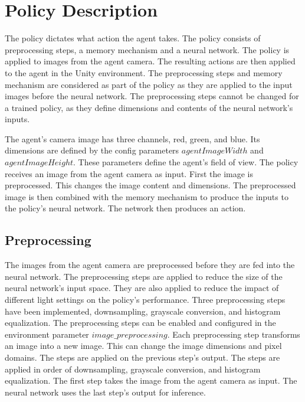 
\section{Policy Description}

\label{fig:policy_description}

The policy dictates what action the agent takes. The policy consists of preprocessing steps, a memory mechanism and a neural network. The policy is applied to images from the agent camera. The resulting actions are then applied to the agent in the Unity environment. 
The preprocessing steps and memory mechanism are considered as part of the policy as they are applied to the input images before the neural network. The preprocessing steps cannot be changed for a trained policy, as they define dimensions and contents of the neural network's inputs.

The agent's camera image has three channels, red, green, and blue. Its dimensions are defined by the config parameters $agentImageWidth$ and $agentImageHeight$. These parameters define the agent's field of view.
The policy receives an image from the agent camera as input. First the image is preprocessed. This changes the image content and dimensions. The preprocessed image is then combined with the memory mechanism to produce the inputs to the policy's neural network. The network then produces an action.


\subsection{Preprocessing}

The images from the agent camera are preprocessed before they are fed into the neural network. The preprocessing steps are applied to reduce the size of the neural network's input space. They are also applied to reduce the impact of different light settings on the policy's performance.
Three preprocessing steps have been implemented, downsampling, grayscale conversion, and histogram equalization. The preprocessing steps can be enabled and configured in the environment parameter $image\_preprocessing$. Each preprocessing step transforms an image into a new image. This can change the image dimensions and pixel domains. The steps are applied on the previous step's output. The steps are applied in order of downsampling, grayscale conversion, and histogram equalization. The first step takes the image from the agent camera as input. 
The neural network uses the last step's output for inference.

